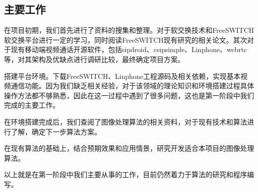 \documentclass[14pt]{extarticle}
\newcommand{\<}{\langle}
\renewcommand{\>}{\rangle}
\theoremstyle{definition}
\begin{document}
\subsection{主要工作}
\par{\qquad 在项目初期，我们首先进行了资料的搜集和整理。对于软交换技术和FreeSWITCH软交换平台进行一定的学习，同时阅读FreeSWITCH现有研究的相关论文。其次对于现有移动端视频通话开源软件，包括sipdroid、csipsimple、Linphone、webrtc等，对其架构及优缺点进行调研比较，最终确定项目方案。}
\par{搭建平台环境。下载FreeSWITCH、Linphone工程源码及相关依赖，实现基本视频通信功能。因为我们缺乏相关经验，对于该领域的理论知识和环境搭建过程具体操作方法都不够熟悉，因此在这一过程中遇到了很多问题，这也是第一阶段中我们完成的主要工作。}
\par{在环境搭建完成后，我们查阅了图像处理算法的相关资料，对于现有技术和算法进行了解，确定下一步算法方案。}
\par{在现有算法的基础上，结合预期效果和应用情景，研究开发适合本项目的图像处理算法。}
\par{以上就是在第一阶段中我们主要从事的工作，目前仍然着力于算法的研究和程序编写。}
\end{document}
